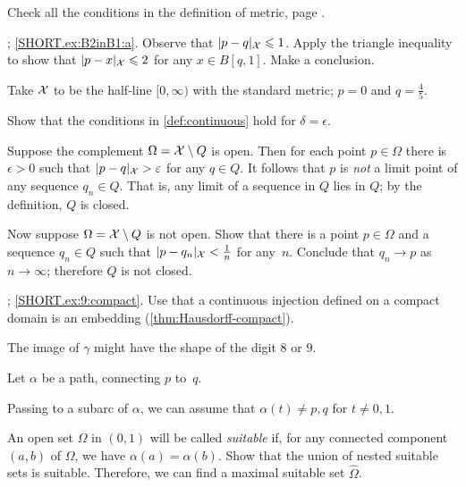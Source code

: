 \setcounter{eqtn}{0}

\raggedcolumns\setlength{\multicolsep}{-10mm}
\begin{multicols}{2}

 Check all the conditions in the definition of metric, page \pageref{page:def:metric}.

\parbf{\ref{ex:B2inB1}}; \ref{SHORT.ex:B2inB1:a}.
Observe that $\dist{p}{q}{\spc{X}}\le 1$. 
Apply the triangle inequality to show that $\dist{p}{x}{\spc{X}}\le 2$ for any $x\in B[q,1]$.
Make a conclusion.

Take $\mathcal{X}$ to be the half-line $[0,\infty)$ with the standard metric; $p=0$ and $q=\tfrac45$.

Show that the conditions in \ref{def:continuous} hold for $\delta=\epsilon$.

Suppose the complement $\Omega=\mathcal{X}\setminus Q$ is open.
Then for each point $p\in \Omega$ there is $\epsilon>0$ such that $\dist{p}{q}{\spc{X}}>\epsilon$ for any $q\in Q$.
It follows that $p$ is \textit{not} a limit point of any sequence $q_n\in Q$.
That is, any limit of a sequence in $Q$ lies in $Q$;
by the definition, $Q$ is closed.

Now suppose $\Omega=\mathcal{X}\setminus Q$ is not open.
Show that there is a point $p\in \Omega$ and a sequence $q_n\in Q$ such that $\dist{p}{q_n}{\spc{X}}\z<\tfrac 1n$ for any~$n$.
Conclude that $q_n\to p$ as $n\to \infty$;
therefore $Q$ is not closed.


\setcounter{eqtn}{0}

\parbf{\ref{ex:9}}; \ref{SHORT.ex:9:compact}. Use that a continuous injection defined on a compact domain is an embedding (\ref{thm:Hausdorff-compact}).

 The image of $\gamma$ might have the shape of the digit $8$ or $9$.

Let $\alpha$ be a path, connecting $p$ to~$q$.

Passing to a subarc of $\alpha$,
we can assume that $\alpha(t)\ne p,q$ for $t\ne0,1$.

An open set $\Omega$ in $(0,1)$ will be called {}\emph{suitable}
if, for any connected component $(a,b)$ of $\Omega$, we have $\alpha(a)=\alpha(b)$.
Show that the union of nested suitable sets is suitable.
Therefore, we can find a maximal suitable set $\hat \Omega$.


\end{multicols}
